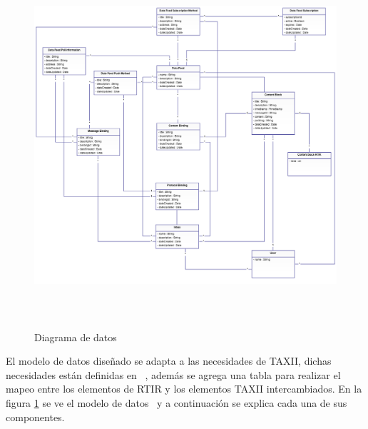 	\begin{figure}[H]
		\centering
		\includegraphics[width=5.7638in,height=5.3126in]{Diseno21-img/Diseno21-img004.png} 
		\caption{Diagrama de datos}
		\label{fig.diagramadedatos}
	\end{figure}
	El modelo de datos diseñado se adapta a las necesidades de TAXII, dichas necesidades están
		definidas en \ \cite{M15}, además se agrega una tabla para realizar el mapeo entre los elementos de RTIR y los elementos
		TAXII intercambiados. En la figura \ref{fig.diagramadedatos} se ve el modelo de datos \ y a continuación se explica cada una de sus
		componentes.
	
	
	\bigskip
	
